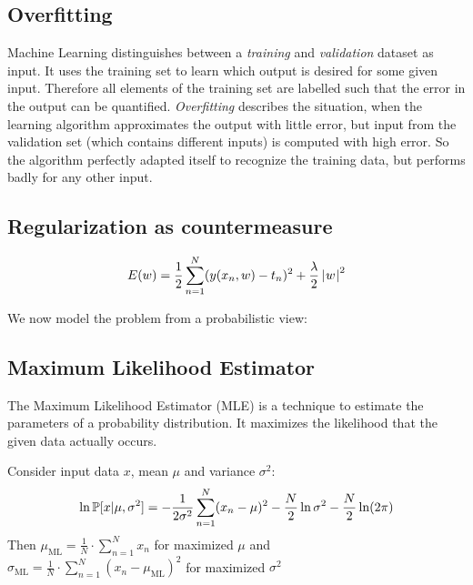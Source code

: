 \subsection{Overfitting}
\label{sec:bp-overfitting}
%
Machine Learning distinguishes between a \emph{training} and \emph{validation} dataset as input.
It uses the training set to learn which output is desired for some given input.
Therefore all elements of the training set are labelled such that the error in the output can be quantified.
\emph{Overfitting} describes the situation, when the learning algorithm approximates the output with little error,
but input from the validation set (which contains different inputs) is computed with high error.
So the algorithm perfectly adapted itself to recognize the training data, but performs badly for any other input.


\subsection{Regularization as countermeasure}
\[ E(w) = \frac12 \sum_{n=1}^N (y(x_n, w) - t_n)^2 + \frac{\lambda}{2} \left|\hspace{0.6999pt}w\hspace{0.6999pt}\right|^2 \]


We now model the problem from a probabilistic view:

\subsection{Maximum Likelihood Estimator}
%
%
%
The Maximum Likelihood Estimator (MLE) is a technique to estimate the parameters of a probability distribution.
It maximizes the likelihood that the given data actually occurs.


\begin{theorem}
  Consider input data $x$, mean $\mu$ and variance $\sigma^2$:
  \[ \ln{\mathbb P[x | \mu, \sigma^2]} = -\frac1{2\sigma^2} \sum_{n=1}^N (x_n - \mu)^2 - \frac{N}{2} \ln{\sigma^2} - \frac{N}{2} \ln(2\pi) \]
  Then
  $\mu_{\text{ML}} = \frac{1}{N} \cdot \sum_{n=1}^N x_n$ for maximized $\mu$ and \\
    $\sigma_{\text{ML}} = \frac{1}{N}\cdot \sum_{n=1}^N (x_n - \mu_{\text{ML}})^2$ for maximized $\sigma^2$
\end{theorem}

